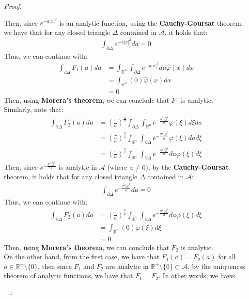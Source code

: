 \begin{proof}{}
\begin{itemize}
      Then, since $e^{-a|x|^2}$ is an analytic function, using the \textbf{Cauchy-Goursat} theorem, we have that for any closed triangle $\Delta$ contained in $\mathcal{A}$, it holds that:
      \begin{align*}
        \int_{\partial\Delta}e^{-a|x|^2}da=0
      \end{align*}
      Thus, we can continue with:
      \begin{align*}
        \int_{\partial \Delta}F_1(a)da&=\int_{\mathbb{R}^n}\int_{\partial\Delta}e^{-a|x|^2}da\hat{\varphi}(x)dx\\
        &=\int_{\mathbb{R}^n}(0)\hat{\varphi}(x)dx\\
        &=0
      \end{align*}
      Then, using \textbf{Morera's theorem}, we can conclude that $F_1$ is analytic.\\
      Similarly, note that:
      \begin{align*}
        \int_{\partial\Delta}F_2(a)da&=\left(\frac{\pi}{a}\right)^{\frac{n}{2}}\int_{\partial\Delta}\int_{\mathbb{R}^n}e^{-\frac{\pi^2|\xi|^2}{a}}\varphi(\xi) d\xi da\\
        &=\left(\frac{\pi}{a}\right)^{\frac{n}{2}}\int_{\mathbb{R}^n}\int_{\partial\Delta}e^{-\frac{\pi^2|\xi|^2}{a}}\varphi(\xi) da d\xi\\
        &=\left(\frac{\pi}{a}\right)^{\frac{n}{2}}\int_{\mathbb{R}^n}\int_{\partial\Delta}e^{-\frac{\pi^2|\xi|^2}{a}} da \varphi(\xi)d\xi
      \end{align*}
      Then, since $e^{-\frac{\pi^2|\xi|^2}{a}}$ is analytic in $\mathcal{A}$ (where $a\neq 0$), by the \textbf{Cauchy-Goursat} theorem, it holds that for any closed triangle $\Delta$ contained in $\mathcal{A}$:
      \begin{align*}
        \int_{\partial\Delta}e^{-\frac{\pi^2|\xi|^2}{a}}da=0
      \end{align*}
      Thus, we can continue with:
      \begin{align*}
        \int_{\partial\Delta}F_2(a)da&=\left(\frac{\pi}{a}\right)^{\frac{n}{2}}\int_{\mathbb{R}^n}\int_{\partial\Delta}e^{-\frac{\pi^2|\xi|^2}{a}} da\varphi(\xi) d\xi\\
        &=\int_{\mathbb{R}^n}(0)\varphi(\xi)d\xi\\
        &=0
      \end{align*}
      Then, using \textbf{Morera's theorem}, we can conclude that $F_2$ is analytic.\\
      On the other hand, from the first case, we have that $F_1(a)=F_2(a)$ for all $a\in\mathbb{R}^{+}\setminus\{0\}$, then since $F_1$ and $F_2$ are analytic in $\mathbb{R}^{+}\setminus\{0\}\subset \mathcal{A}$, by the uniqueness theorem of analytic functions, we have that $F_1=F_2$. In other words, we have:

\end{itemize}
\end{proof}
